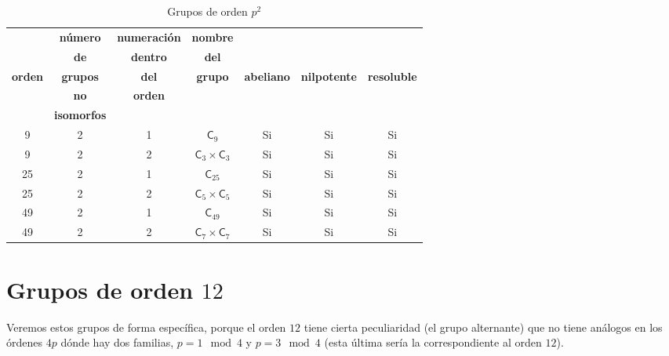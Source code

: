 \documentclass[12pt,a4paper,fleqn,spanish,final,openright]{extbook}
\theoremstyle{definition}
\theoremstyle{remark}
\begin{document}
\begin{table}[h!]
    \begin{center}
        \caption{Grupos de orden $p^2$}
        \label{tab:GruposOrden2p}
        \begin{tabular}{c|c|c|c|c|c|c} %
            \textbf{} & \tiny\textbf{número} &\tiny\textbf{numeración} & \tiny\textbf{nombre} & \textbf{} & {} & {} \\
            \textbf{} & \tiny\textbf{de} &\tiny\textbf{dentro} & \tiny\textbf{del} & \tiny\textbf{} & {} & {} \\
            \tiny\textbf{orden} & \tiny\textbf{grupos} & \tiny\textbf{del} & \tiny\textbf{grupo} & \tiny\textbf{abeliano}  & \tiny\textbf{nilpotente} & \tiny\textbf{resoluble} \\
            \textbf{} & \tiny\textbf{no} & \tiny\textbf{orden} & \textbf{} & \textbf{} & {} & {} \\
            \textbf{} & \tiny\textbf{isomorfos} &\textbf{} & \textbf{} & \textbf{} & {} & {} \\
            \hline
            9 & 2 & 1 & ${\textsf{C}}_{9}$ & Si & Si & Si \\
            \hline
            9 & 2 & 2  & ${{\textsf{C}}_{3}}   \times   {{\textsf{C}}_{3}}$ & Si & Si & Si \\
            \hline
            25 & 2 & 1 & ${{\textsf{C}}_{25}}$ & Si & Si & Si \\
            \hline
            25 & 2 & 2 & ${{\textsf{C}}_{5}}   \times   {{\textsf{C}}_{5}}$ & Si & Si & Si \\
            \hline
            49 & 2 & 1 & ${{\textsf{C}}_{49}}$ & Si & Si & Si \\
            \hline
            49 & 2 & 2 & ${{\textsf{C}}_{7}}   \times   {{\textsf{C}}_{7}}$ & Si & Si & Si \\
            \hline
        \end{tabular}
    \end{center}
\end{table}


\chapter{Grupos de orden $12$}

Veremos estos grupos de forma específica, porque el orden $12$ tiene cierta peculiaridad (el grupo alternante) que no tiene análogos en los órdenes $4p$ dónde hay dos familias, $p=1 \mod 4$ y $p=3\mod 4$ (esta última sería la correspondiente al orden $12$).
\end{document}
